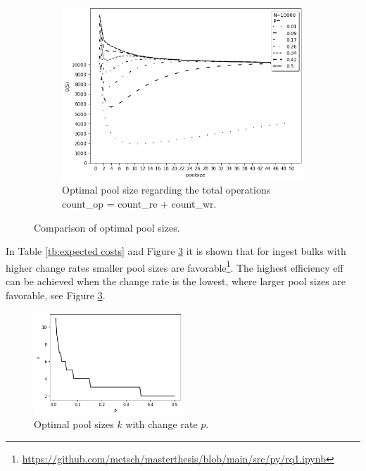 \documentclass[final]{vutinfth}
\begin{document}
\begin{figure}[t]
\begin{subfigure}{6cm}
        \includegraphics[width=\linewidth]{graphics/expected_operations.png}
        \caption{Optimal pool size regarding the total operations \acrshort{count_op} = \acrshort{count_re} + \acrshort{count_wr}.}\label{fig:expected_operations}
    \end{subfigure}
    \caption{Comparison of optimal pool sizes.}
\end{figure}
In Table \ref{tb:expected costs} and Figure \ref{fig:poolsizes} it is shown that for ingest bulks with higher change rates smaller pool sizes are favorable\footnote{\url{https://github.com/metsch/masterthesis/blob/main/src/py/rq1.ipynb}}.
The highest efficiency \acrshort{eff} can be achieved when the change rate is the lowest, where larger pool sizes are favorable, see Figure \ref{fig:poolsizes}.
\begin{figure}[t]\centering
    \includegraphics[width=0.5\textwidth]{graphics/poolsizes.png}
    \caption{Optimal pool sizes $k$ with change rate $p$.}
    \label{fig:poolsizes}
\end{figure}
\end{document}
